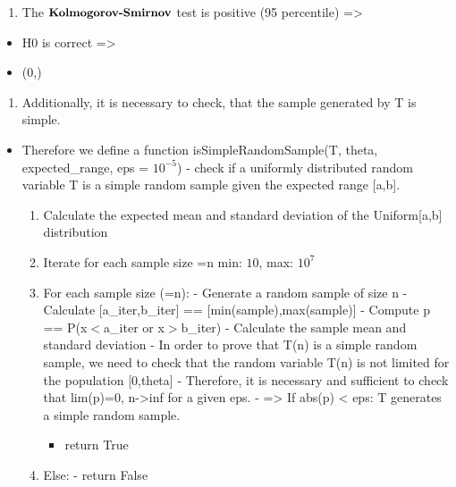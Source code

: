 \documentclass[11pt]{article}
\providecommand{\tightlist}{%
      \setlength{\itemsep}{0pt}\setlength{\parskip}{0pt}}
\def\gt{>}
\def\lt{<}
\begin{document}
    \begin{enumerate}
\def\labelenumi{\arabic{enumi}.}
\setcounter{enumi}{3}
\tightlist
\item
  The \(\small{\textbf{Kolmogorov-Smirnov}}\) test is positive (95
  percentile) =\textgreater{}
\end{enumerate}

\begin{itemize}
\tightlist
\item
  H0 is correct =\textgreater{}
\item
  \equiv{}(0,\theta)
\end{itemize}

    \begin{enumerate}
\def\labelenumi{\arabic{enumi}.}
\setcounter{enumi}{4}
\tightlist
\item
  Additionally, it is necessary to check, that the sample generated by T
  is simple.
\end{enumerate}
\begin{itemize}
\tightlist
\item
  Therefore we define a function isSimpleRandomSample(T, theta,
  expected\_range, eps = \(10^{-5}\)) - check if a uniformly distributed
  random variable T is a simple random sample given the expected range
  {[}a,b{]}.

  \begin{enumerate}
  \def\labelenumi{\arabic{enumi}.}
  \tightlist
  \item
    Calculate the expected mean and standard deviation of the
    Uniform{[}a,b{]} distribution
  \item
    Iterate for each sample size =n min: \(10\), max: \(10^7\)
  \item
    For each sample size (=n): - Generate a random sample of size n -
    Calculate {[}a\_iter,b\_iter{]} == {[}min(sample),max(sample){]} -
    Compute p == P(x\(\lt\)a\_iter or x\(\gt\)b\_iter) - Calculate the
    sample mean and standard deviation - In order to prove that T(n) is
    a simple random sample, we need to check that the random variable
    T(n) is not limited for the population {[}0,theta{]} - Therefore, it
    is necessary and sufficient to check that lim(p)=0,
    n-\textgreater inf for a given eps. - =\textgreater{} If abs(p)
    \textless{} eps: T generates a simple random sample.

    \begin{itemize}
    \tightlist
    \item
      return True
    \end{itemize}
  \item
    Else: - return False
  \end{enumerate}
\end{itemize}
\end{document}
